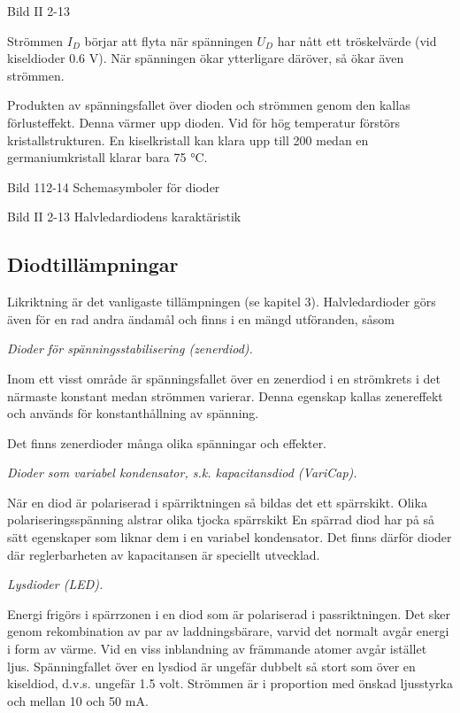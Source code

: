 Bild II 2-13

Strömmen \(I_D\) börjar att flyta när spänningen \(U_D\) har nått ett
tröskelvärde (vid kiseldioder 0.6 V). När spänningen ökar ytterligare däröver,
så ökar även strömmen.

Produkten av spänningsfallet över dioden och strömmen genom den kallas
förlusteffekt. Denna värmer upp dioden. Vid för hög temperatur förstörs
kristallstrukturen. En kiselkristall kan klara upp till 200 medan en
germaniumkristall klarar bara 75 °C.

Bild 112-14 Schemasymboler för dioder

Bild II 2-13 Halvledardiodens karaktäristik

\subsection{Diodtillämpningar}

Likriktning är det vanligaste tillämpningen (se kapitel 3). %
Halvledardioder görs även för en rad andra ändamål och finns i en mängd
utföranden, såsom

\emph{Dioder för spänningsstabilisering (zenerdiod).}

  Inom ett visst område är spänningsfallet över en zenerdiod i en strömkrets
  i det närmaste konstant medan strömmen varierar. Denna egenskap kallas
  zenereffekt och används för konstanthållning av spänning.

  Det finns zenerdioder många olika spänningar och effekter.

\emph{Dioder som variabel kondensator, s.k. kapacitansdiod (VariCap).}

  När en diod är polariserad i spärriktningen så bildas det ett spärrskikt.
  Olika polariseringsspänning alstrar olika tjocka spärrskikt En spärrad diod
  har på så sätt egenskaper som liknar dem i en variabel kondensator. Det finns
  därför dioder där reglerbarheten av kapacitansen är speciellt utvecklad.

\emph{Lysdioder (LED).}

  Energi frigörs i spärrzonen i en diod som är polariserad i passriktningen. Det
  sker genom rekombination av par av laddningsbärare, varvid det normalt avgår
  energi i form av värme. Vid en viss inblandning av främmande atomer avgår
  istället ljus. Spänningfallet över en lysdiod är ungefär dubbelt så stort som
  över en kiseldiod, d.v.s. ungefär 1.5 volt. Strömmen är i proportion med
  önskad ljusstyrka och mellan 10 och 50 mA.

